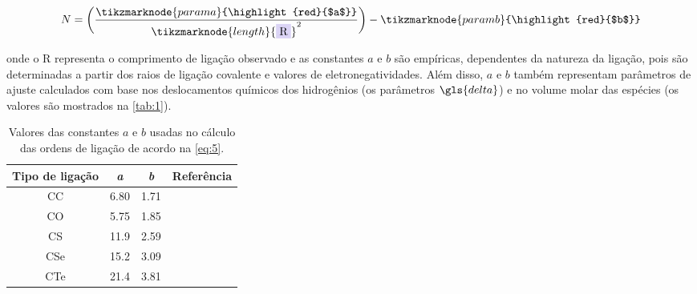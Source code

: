 \begin{figure}[htb]
\vspace{3.5\baselineskip}

\begin{equation}
    \label{eq:5}
    N = \bigg{(} \frac{\tikzmarknode{parama}{\highlight{red}{$a$}}}{\tikzmarknode{length}{\highlight{blue}{R}}^2} \bigg{)} - \tikzmarknode{paramb}{\highlight{red}{$b$}}
\end{equation}
\vspace{1.2\baselineskip}
\end{figure}

\noindent onde o R representa o comprimento de ligação observado e as constantes $a$ e $b$ são empíricas, dependentes da natureza da ligação, pois são determinadas a partir dos raios de ligação covalente e valores de eletronegatividades. Além disso, $a$ e $b$ também representam parâmetros de ajuste calculados com base nos deslocamentos químicos dos hidrogênios (os parâmetros $\gls{delta}$) e no volume molar das espécies (os valores são mostrados na \autoref{tab:1}).

\begin{table}[htb]
	\centering
	\caption{\label{tab:1} Valores das constantes $a$ e $b$ usadas no cálculo das ordens de ligação de acordo na \autoref{eq:5}.}
	\begin{tabular}{cccc}
		\toprule
		\textbf{Tipo de ligação} & \textbf{\textit{a}} & \textbf{\textit{b}} & \textbf{Referência}
		\\ 
		\midrule
        CC & 6.80 & 1.71 & \cite{Gordy1947} \\
        CO & 5.75 & 1.85 & \cite{Gordy1947} \\
        CS & 11.9 & 2.59 & \cite{Gordy1947} \\
        CSe & 15.2 & 3.09 & \cite{Fringuelli1974}\\
        CTe & 21.4 & 3.81 & \cite{Fringuelli1974}\\
    \bottomrule
	\end{tabular}
\end{table}

